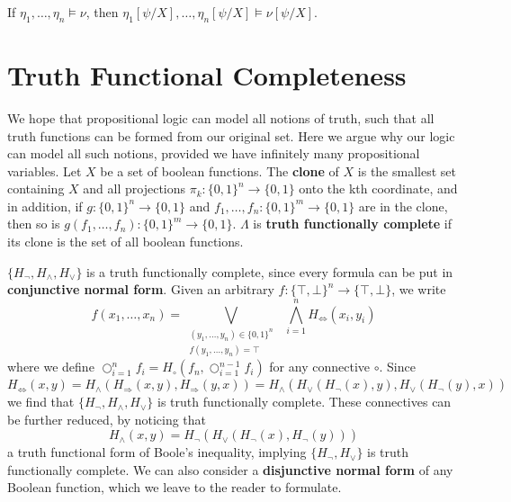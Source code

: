 \begin{corollary}
    If $\eta_1, \dots, \eta_n \vDash \nu$, then $\eta_1[\psi/X], \dots, \eta_n[\psi/X] \vDash \nu[\psi/X]$.
\end{corollary}

\section{Truth Functional Completeness}

We hope that propositional logic can model all notions of truth, such that all truth functions can be formed from our original set. Here we argue why our logic can model all such notions, provided we have infinitely many propositional variables. Let $X$ be a set of boolean functions. The {\bf clone} of $X$ is the smallest set containing $X$ and all projections $\pi_k : \{ 0, 1 \}^n \to \{ 0, 1 \}$ onto the kth coordinate, and in addition, if $g: \{ 0, 1 \}^n \to \{ 0, 1 \}$ and $f_1, \dots, f_n : \{ 0, 1 \}^m \to \{ 0, 1 \}$ are in the clone, then so is $g(f_1, \dots, f_n): \{ 0, 1 \}^m \to \{ 0, 1 \}$. $\Lambda$ is {\bf truth functionally complete} if its clone is the set of all boolean functions.

\begin{example}
    $\{ H_\neg, H_\wedge, H_\vee \}$ is a truth functionally complete, since every formula can be put in {\bf conjunctive normal form}. Given an arbitrary $f: \{ \top, \bot \}^n \to \{ \top, \bot \}$, we write
    \[ f(x_1, \dots, x_n) = \bigvee_{\substack{(y_1, \dots, y_n) \in \{ 0, 1 \}^n\\f(y_1, \dots, y_n) = \top}}\ \  \bigwedge_{i = 1}^n H_\Leftrightarrow(x_i, y_i) \]
    where we define $\bigcirc_{i = 1}^n f_i = H_\circ(f_n, \bigcirc_{i = 1}^{n-1} f_i)$ for any connective $\circ$. Since
    \[ H_\Leftrightarrow(x,y) = H_\wedge(H_\Rightarrow(x,y), H_\Rightarrow(y,x)) = H_\wedge(H_\vee(H_\neg(x), y), H_\vee(H_\neg(y), x)) \]
    we find that $\{ H_\neg, H_\wedge, H_\vee \}$ is truth functionally complete. These connectives can be further reduced, by noticing that
    \[ H_\wedge(x,y) = H_\neg(H_\vee(H_\neg(x), H_\neg(y))) \]
    a truth functional form of Boole's inequality, implying $\{ H_\neg, H_\vee \}$ is truth functionally complete. We can also consider a {\bf disjunctive normal form} of any Boolean function, which we leave to the reader to formulate.
\end{example}

